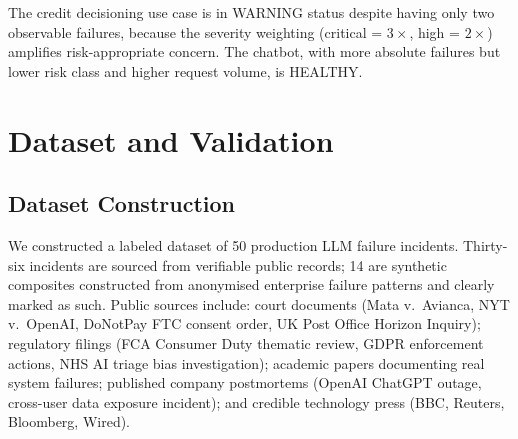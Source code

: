 \documentclass{article}
\begin{document}
\begin{table}[t]
\caption{Failure budget utilisation example.  One critical C5 and one high C3
on a Decision-Critical use case puts it in WARNING status.}
\label{tab:budget_example}
\centering
\small
{}
\end{table}

The credit decisioning use case is in WARNING status despite having only two
observable failures, because the severity weighting (critical = $3\times$,
high = $2\times$) amplifies risk-appropriate concern.  The chatbot, with more
absolute failures but lower risk class and higher request volume, is HEALTHY.

\section{Dataset and Validation}
\label{sec:dataset}

\subsection{Dataset Construction}

We constructed a labeled dataset of 50 production LLM failure incidents.
Thirty-six incidents are sourced from verifiable public records; 14 are
synthetic composites constructed from anonymised enterprise failure patterns
and clearly marked as such.  Public sources include: court documents (Mata v.\
Avianca, NYT v.\ OpenAI, DoNotPay FTC consent order, UK Post Office Horizon
Inquiry); regulatory filings (FCA Consumer Duty thematic review, GDPR
enforcement actions, NHS AI triage bias investigation); academic papers
documenting real system failures; published company postmortems (OpenAI
ChatGPT outage, cross-user data exposure incident); and credible technology
press (BBC, Reuters, Bloomberg, Wired).
\end{document}
